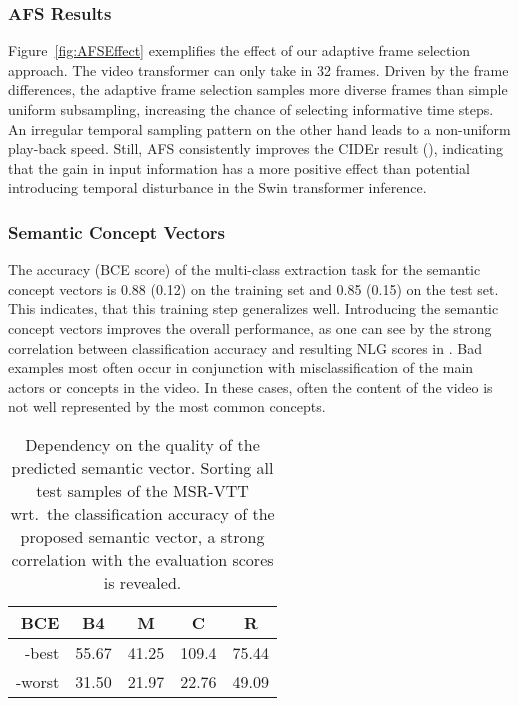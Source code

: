 \documentclass[runningheads,table]{llncs}
\begin{document}
\subsubsection{AFS Results}
Figure~\ref{fig:AFSEffect} exemplifies the effect of our adaptive frame selection approach. The video transformer can only take in 32 frames.
Driven by the frame differences, the adaptive frame selection samples more diverse frames than simple uniform subsampling, increasing the chance of selecting informative time steps. 
An irregular temporal sampling pattern on the other hand leads to a non-uniform play-back speed.  
Still, AFS consistently improves the CIDEr result (), indicating that the gain in input information has a more positive effect than potential introducing temporal disturbance in the Swin transformer inference.


\subsubsection{Semantic Concept Vectors}
The accuracy (BCE score) of the multi-class extraction task for the semantic concept vectors is 0.88 (0.12) on the training set and 0.85 (0.15) on the test set. This indicates, that this training step generalizes well. Introducing the semantic concept vectors improves the overall performance, as one can see by the strong correlation between classification accuracy and resulting NLG scores in .
Bad examples most often occur in conjunction with misclassification of the main actors or concepts in the video. 
In these cases, often the content of the video is not well represented by the most common  concepts.

\begin{table*}[tb]
\centering
        \begin{tabular}{rcccc}
  \toprule
      BCE                                  & B4                       & M                   & C           & R    
                  \\
            \midrule
        -best & 55.67 & 41.25& 109.4& 75.44      \\
        
         -worst & 31.50 & 21.97& 22.76& 49.09
        \\
          \bottomrule
        \end{tabular}
    \caption{Dependency on the quality of the predicted semantic vector. Sorting all test samples of the MSR-VTT wrt.\ the classification accuracy of the proposed semantic vector, a strong correlation with the evaluation scores is revealed.}\label{tab:ablations_sman}
\end{table*}
\end{document}
